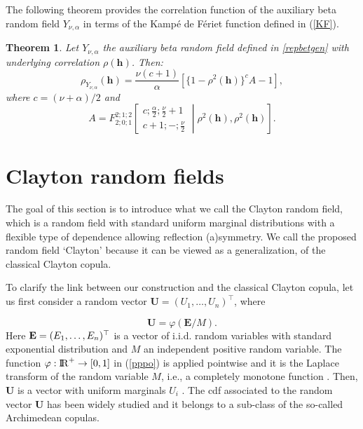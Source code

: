 \documentclass[times,sort&compress,3p]{elsarticle}
\theoremstyle{plain}%
\newtheorem{theorem}{Theorem}
\theoremstyle{definition}
\def\hh{\bm{h}}
\def\R{{\rm I\! R}}
\begin{document}
The following theorem provides the  correlation function of the  auxiliary  beta random field $Y_{\nu,\alpha}$ in terms of the Kampé de Fériet function defined in (\ref{KF}).
\begin{theorem}\label{theo2}
Let $Y_{\nu,\alpha}$ the auxiliary   beta random field defined in  \eqref{repbetgen} with underlying correlation $\rho(\hh)$. Then:
\begin{equation}\label{CC}
\rho_{Y_{\nu,\alpha}}(\hh)=\frac{\nu (c+1)}{\alpha}\left[\{1-\rho^2(\hh)\}^{c}A-1\right],
\end{equation}
    where $c=(\nu+\alpha)/2$ and
\begin{equation*}\label{A1}
A=F_{2;0;1}^{2;1;2}\left[ \begin{array}{c}
                                  c;\frac{\alpha}{2};\frac{\nu}{2}+1\\
                                  c+1;-;\frac{\nu}{2}
                                \end{array}\middle\vert \rho^{2}(\hh),\rho^{2}(\hh)\right].
\end{equation*}
\end{theorem}


\section{Clayton  random fields}\label{sec:3}
The goal of this section is to introduce what we call the  Clayton  random field, which is a random field with standard uniform marginal distributions with a flexible type of dependence allowing reflection (a)symmetry.
We call the proposed random field `Clayton' because it  can be viewed as a generalization, of the classical Clayton copula.

To clarify the link between our construction and the classical Clayton copula, let us first  consider a random vector ${\mathbf{U}}=(U_1,\dots,U_n)^\top$, where

\begin{equation}\label{pppo}
\mathbf{U}=\varphi\left(\mathbf{E}/M\right).
\end{equation}
Here  ${\bf E}=(E_1,\dots,E_n)^\top$ is a vector of  i.i.d. random variables with standard exponential distribution and $M$ an independent positive  random variable. The function  $\varphi:   \R^+ \to [0,1]$ in (\ref{pppo}) is applied pointwise
 and it is the Laplace transform of the random variable $M$, i.e., a completely monotone function \citep{Miller2001}.
  Then,  $\mathbf{U}$ is a vector with uniform marginals $U_i$  \citep{MO1988, Mai2014}.
  The cdf associated to the random vector $\mathbf{U}$ has been widely studied
  and it belongs to a sub-class of the so-called Archimedean copulas.
\end{document}
